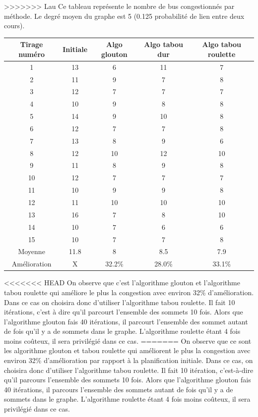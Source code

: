 \documentclass[a4paper,11pt]{article}
\begin{document}
	\newpage
>>>>>>> Lau
	Ce tableau représente le nombre de bus congestionnés par méthode. Le degré moyen du graphe est 5 (0.125 probabilité de lien entre deux cours).\\ 
	\begin{tabular}{|c|c|c|c|c|}
  		\hline
  		Tirage numéro & Initiale & Algo glouton & Algo tabou dur & Algo tabou roulette\\
  		\hline
  		1 & 13 & 6 & 11 & 7\\
  		\hline
  		2 & 11 & 9 & 7 & 8\\
  		\hline
  		3 & 12 & 7 & 7 & 7\\
  		\hline
  		4 & 10 & 9 & 8 & 8\\
  		\hline
  		5 & 14 & 9 & 10 & 8\\
  		\hline
  		6 & 12 & 7 & 7 & 8\\
  		\hline
  		7 & 13 & 8 & 9 & 6\\
  		\hline
  		8 & 12 & 10 & 12 & 10\\
  		\hline
  		9 & 11 & 8 & 9 & 8\\
  		\hline
  		10 & 12 & 7 & 7 & 7\\
  		\hline
  		11 & 10 & 9 & 9 & 8\\
  		\hline
  		12 & 11 & 10 & 10 & 10\\
  		\hline
  		13 & 16 & 7 & 8 & 10\\
  		\hline
  		14 & 10 & 7 & 6 & 6\\
  		\hline
  		15 & 10 & 7 & 7 & 8\\
  		\hline
  		Moyenne & 11.8 & 8 & 8.5 & 7.9\\
  		\hline
  		Amélioration & X & 32.2\% & 28.0\% & 33.1\%\\
  		\hline
	\end{tabular}
<<<<<<< HEAD
	On observe que c'est l'algorithme glouton et l'algorithme tabou roulette qui améliore le plus la congestion avec environ 32\% d'amélioration. Dans ce cas on choisira donc d'utiliser l'algorithme tabou roulette. Il fait 10 itérations, c'est à dire qu'il parcourt l'ensemble des sommets 10 fois. Alors que l'algorithme glouton fais 40 itérations, il parcourt l'ensemble des sommet autant de fois qu'il y a de sommets dans le graphe. L'algorithme roulette étant 4 fois moins coûteux, il sera privilégié dans ce cas.
=======
	On observe que ce sont les algorithme glouton et tabou roulette qui améliorent le plus la congestion avec environ 32\% d'amélioration par rapport à la planification initiale. Dans ce cas, on choisira donc d'utiliser l'algorithme tabou roulette. Il fait 10 itération, c'est-à-dire qu'il parcours l'ensemble des sommets 10 fois. Alors que l'algorithme glouton fais 40 itérations, il parcours l'ensemble des sommets autant de fois qu'il y a de sommets dans le graphe. L'algorithme roulette étant 4 fois moins coûteux, il sera privilégié dans ce cas.
\end{document}
